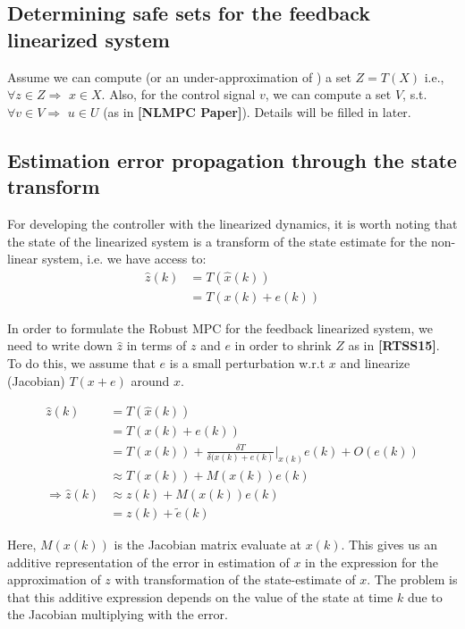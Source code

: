 \documentclass{article}[14pt]
\begin{document}
\subsection{Determining safe sets for the feedback linearized system}
Assume we can compute (or an under-approximation of ) a set $Z=T(X)$ i.e., $\forall z \in Z \Rightarrow$ $x \in X$. Also, for the control signal $v$, we can compute a set $V$, s.t. $\forall v \in V \Rightarrow$ $u\in U$ (as in \textbf{[NLMPC Paper]}). Details will be filled in later.

\subsection{Estimation error propagation through the state transform}
For developing the controller with the linearized dynamics, it is worth noting that the state of the linearized system is a transform of the state estimate for the non-linear system, i.e. we have access to:
\begin{subequations}
\begin{align}
\hat{z}(k)&=T(\hat{x}(k)) \\
&=T(x(k)+e(k)) %
\end{align}
\end{subequations}

In order to formulate the Robust MPC for the feedback linearized system, we need to write down $\hat{z}$ in terms of $z$ and $e$ in order to shrink $Z$ as in \textbf{[RTSS15]}. To do this, we assume that $e$ is a small perturbation w.r.t $x$ and linearize (Jacobian) $T(x+e)$ around $x$.

\begin{subequations}
\label{eq:Zerror}
\begin{align}
\hat{z}(k)&=T(\hat{x}(k)) \\
&=T(x(k)+e(k)) \\
&=T(x(k)) + \frac{\delta T}{\delta(x(k)+e(k)}\bigg|_{x(k)}e(k) + O(e(k)) \\ 
&\approx T(x(k)) + M(x(k))e(k) \\
\Rightarrow \hat{z}(k) &\approx z(k)+M(x(k))e(k) \\
&=z(k)+\tilde{e}(k)
\end{align}
\end{subequations}

Here, $M(x(k))$ is the Jacobian matrix evaluate at $x(k)$. This gives us an additive representation of the error in estimation of $x$ in the expression for the approximation of $z$ with transformation of the state-estimate of $x$. The problem is that this additive expression depends on the value of the state at time $k$ due to the Jacobian multiplying with the error.
\end{document}
